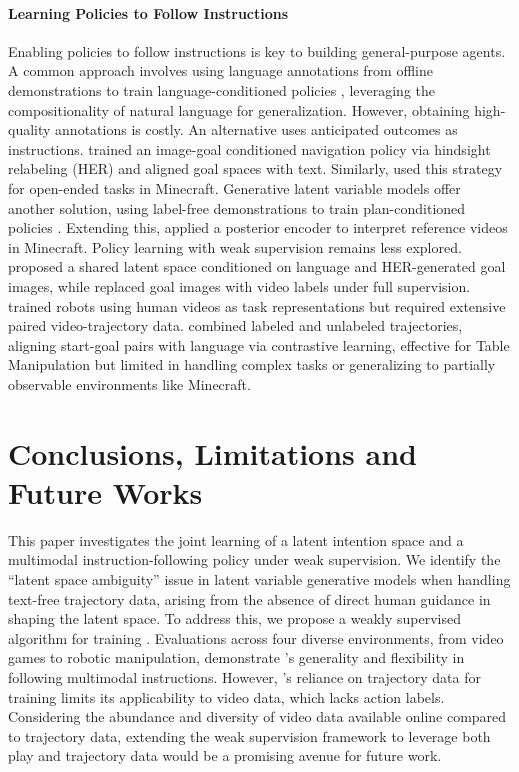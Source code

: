 \paragraph{Learning Policies to Follow Instructions}
Enabling policies to follow instructions is key to building general-purpose agents. A common approach involves using language annotations from offline demonstrations to train language-conditioned policies \citep{iii, rt-1, gato, worldmc, leo, sima, deps, jarvis-1}, leveraging the compositionality of natural language for generalization. However, obtaining high-quality annotations is costly. 
An alternative uses anticipated outcomes as instructions. \cite{zson} trained an image-goal conditioned navigation policy via hindsight relabeling (HER) \citep{her} and aligned goal spaces with text. Similarly, \cite{steve1} used this strategy for open-ended tasks in Minecraft. Generative latent variable models offer another solution, using label-free demonstrations to train plan-conditioned policies \citep{lmp, opal}. Extending this, \cite{groot1} applied a posterior encoder to interpret reference videos in Minecraft. 
Policy learning with weak supervision remains less explored. \cite{lcil} proposed a shared latent space conditioned on language and HER-generated goal images, while \cite{bcz} replaced goal images with video labels under full supervision. 
\cite{vid2robot} trained robots using human videos as task representations but required extensive paired video-trajectory data. \cite{grif} combined labeled and unlabeled trajectories, aligning start-goal pairs with language via contrastive learning, effective for Table Manipulation but limited in handling complex tasks or generalizing to partially observable environments like Minecraft. 


\section{Conclusions, Limitations and Future Works}
\label{sec:conclusion}
This paper investigates the joint learning of a latent intention space and a multimodal instruction-following policy under weak supervision. We identify the “latent space ambiguity” issue in latent variable generative models when handling text-free trajectory data, arising from the absence of direct human guidance in shaping the latent space. To address this, we propose a weakly supervised algorithm for training \agent. Evaluations across four diverse environments, from video games to robotic manipulation, demonstrate \agent’s generality and flexibility in following multimodal instructions. 
However, \agent’s reliance on trajectory data for training limits its applicability to video data, which lacks action labels. Considering the abundance and diversity of video data available online compared to trajectory data, extending the weak supervision framework to leverage both play and trajectory data would be a promising avenue for future work. 